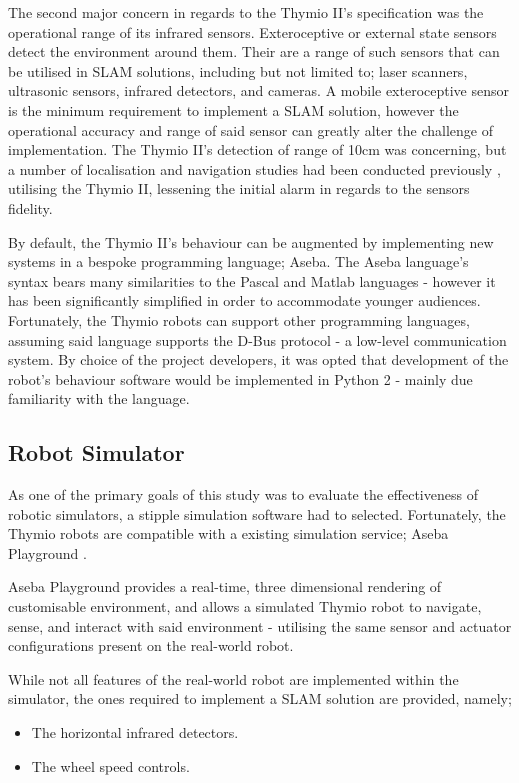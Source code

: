 The second major concern in regards to the Thymio II's specification was the
operational range of its infrared sensors.
Exteroceptive or external state sensors detect the environment around
them.
Their are a range of such sensors that can be utilised in SLAM solutions,
including but not limited to; laser scanners, ultrasonic sensors, infrared
detectors, and cameras.
A mobile exteroceptive sensor is the minimum requirement to implement a SLAM
solution, however the operational accuracy and range of said sensor can
greatly alter the challenge of implementation.
The Thymio II's detection of range of 10cm was concerning, but a number of
localisation and navigation studies had been conducted previously
\cite{Wang2016}, utilising the Thymio II, lessening the initial alarm in
regards to the sensors fidelity.

By default, the Thymio II's behaviour can be augmented by implementing
new systems in a bespoke programming language; Aseba.
The Aseba language's syntax bears many similarities to the Pascal and
Matlab languages - however it has been significantly simplified in order to
accommodate younger audiences.
Fortunately, the Thymio robots can support other programming languages,
assuming said language supports the D-Bus protocol - a low-level communication
system.
By choice of the project developers, it was opted that development of the
robot's behaviour software would be implemented in Python 2 - mainly due
familiarity with the language.

\subsection{Robot Simulator}
As one of the primary goals of this study was to evaluate the effectiveness of
robotic simulators, a stipple simulation software had to selected.
Fortunately, the Thymio robots are compatible with a existing simulation
service; Aseba Playground \cite{aseba-community}.

Aseba Playground provides a real-time, three dimensional rendering of
customisable environment, and allows a simulated Thymio robot to navigate,
sense, and interact with said environment - utilising the same sensor and
actuator configurations present on the real-world robot.

While not all features of the real-world robot are implemented within the
simulator, the ones required to implement a SLAM solution are provided, namely;

\begin{itemize}
\item The horizontal infrared detectors.
\item The wheel speed controls.
\end{itemize}

